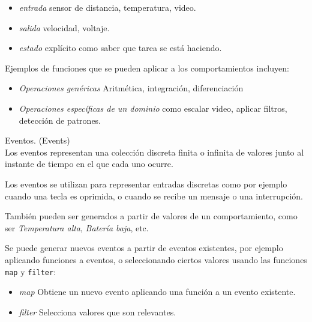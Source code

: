 \begin{itemize}
  \item \textit{entrada} sensor de distancia, temperatura, video.
  \item \textit{salida} velocidad, voltaje.
  \item \textit{estado} explícito como saber que tarea se está haciendo.
\end{itemize}

  Ejemplos de funciones que se pueden aplicar a los
comportamientos incluyen:

\begin{itemize}
\item \textit{Operaciones genéricas} Aritmética, integración, diferenciación
\item {
    \textit{Operaciones específicas de un dominio} como escalar video,
    aplicar filtros, detección de patrones.
}
\end{itemize}



\begin{definicion}
  Eventos. (Events)\\

  Los eventos representan una colección discreta finita o infinita de valores
  junto al instante de tiempo en el que cada uno ocurre.


\end{definicion}

  Los eventos se utilizan para representar entradas discretas como por
ejemplo cuando una tecla es oprimida, o cuando se recibe un
mensaje o una interrupción.

  También pueden ser generados a partir de valores de un comportamiento,
como ser \emph{Temperatura alta}, \emph{Batería baja}, etc.

  Se puede generar nuevos eventos a partir de eventos existentes, por
ejemplo aplicando funciones a eventos, o seleccionando ciertos valores
usando las funciones \texttt{map} y \texttt{filter}:

\begin{itemize}
  \item {
      \textit{map} Obtiene un nuevo evento aplicando una función
                   a un evento existente.
  }
  \item {
      \textit{filter} Selecciona valores que son relevantes.
  }
\end{itemize}


